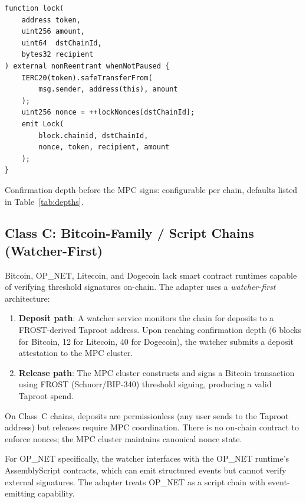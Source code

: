 \begin{lstlisting}[language=Solidity,caption={TeleportVault lock function (simplified)}]
function lock(
    address token,
    uint256 amount,
    uint64  dstChainId,
    bytes32 recipient
) external nonReentrant whenNotPaused {
    IERC20(token).safeTransferFrom(
        msg.sender, address(this), amount
    );
    uint256 nonce = ++lockNonces[dstChainId];
    emit Lock(
        block.chainid, dstChainId,
        nonce, token, recipient, amount
    );
}
\end{lstlisting}

Confirmation depth before the MPC signs: configurable per chain, defaults listed in Table~\ref{tab:depths}.

\subsection{Class C: Bitcoin-Family / Script Chains (Watcher-First)}
\label{sec:class-c}

Bitcoin, OP\_NET, Litecoin, and Dogecoin lack smart contract runtimes capable of verifying threshold signatures on-chain. The adapter uses a \emph{watcher-first} architecture:

\begin{enumerate}[nosep]
  \item \textbf{Deposit path}: A watcher service monitors the chain for deposits to a FROST-derived Taproot address. Upon reaching confirmation depth (6 blocks for Bitcoin, 12 for Litecoin, 40 for Dogecoin), the watcher submits a deposit attestation to the MPC cluster.
  \item \textbf{Release path}: The MPC cluster constructs and signs a Bitcoin transaction using FROST (Schnorr/BIP-340) threshold signing, producing a valid Taproot spend.
\end{enumerate}


\begin{property}
On Class~C chains, deposits are permissionless (any user sends to the Taproot address) but releases require MPC coordination. There is no on-chain contract to enforce nonces; the MPC cluster maintains canonical nonce state.
\end{property}

For OP\_NET specifically, the watcher interfaces with the OP\_NET runtime's AssemblyScript contracts, which can emit structured events but cannot verify external signatures. The adapter treats OP\_NET as a script chain with event-emitting capability.

